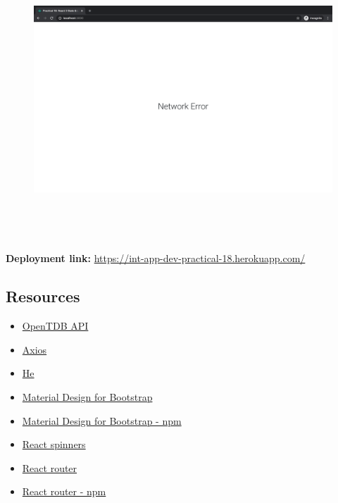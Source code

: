 \documentclass{article}
\begin{document}
\begin{figure}[H]
  \includegraphics[width=175mm, height=105mm]{./img/18-expected-opentdb-5.png}
\end{figure}

\textbf{Deployment link:} \href{https://int-app-dev-practical-18.herokuapp.com/}{https://int-app-dev-practical-18.herokuapp.com/} 

\subsection*{Resources} 
\begin{itemize}
  \item \href{https://opentdb.com/}{OpenTDB API}
  \item \href{https://www.npmjs.com/package/axios/}{Axios}
  \item \href{https://www.npmjs.com/package/he/}{He}
  \item \href{https://mdbootstrap.com/}{Material Design for Bootstrap}
  \item \href{https://www.npmjs.com/package/mdbreact/}{Material Design for Bootstrap - npm}
  \item \href{https://www.npmjs.com/package/react-spinners/}{React spinners}
  \item \href{https://reactrouter.com}{React router}
  \item \href{https://www.npmjs.com/package/react-router/}{React router - npm}
\end{itemize}
 
\end{document}
